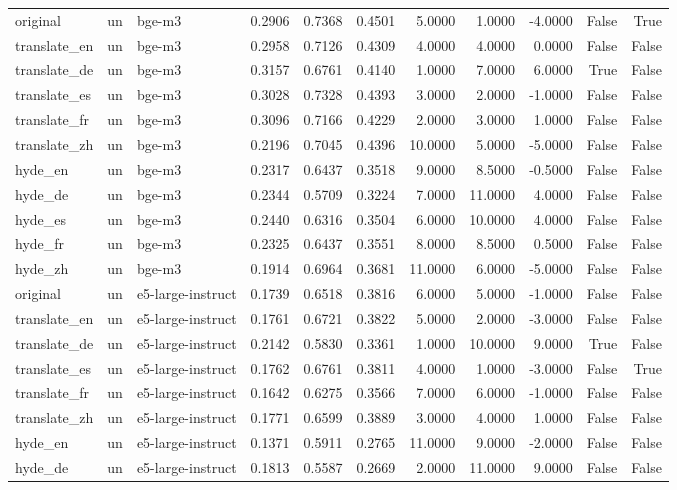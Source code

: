 \begin{tabular}{lllrrrrrrrr}
original & un & bge-m3 & 0.2906 & 0.7368 & 0.4501 & 5.0000 & 1.0000 & -4.0000 & False & True \\
translate\_en & un & bge-m3 & 0.2958 & 0.7126 & 0.4309 & 4.0000 & 4.0000 & 0.0000 & False & False \\
translate\_de & un & bge-m3 & 0.3157 & 0.6761 & 0.4140 & 1.0000 & 7.0000 & 6.0000 & True & False \\
translate\_es & un & bge-m3 & 0.3028 & 0.7328 & 0.4393 & 3.0000 & 2.0000 & -1.0000 & False & False \\
translate\_fr & un & bge-m3 & 0.3096 & 0.7166 & 0.4229 & 2.0000 & 3.0000 & 1.0000 & False & False \\
translate\_zh & un & bge-m3 & 0.2196 & 0.7045 & 0.4396 & 10.0000 & 5.0000 & -5.0000 & False & False \\
hyde\_en & un & bge-m3 & 0.2317 & 0.6437 & 0.3518 & 9.0000 & 8.5000 & -0.5000 & False & False \\
hyde\_de & un & bge-m3 & 0.2344 & 0.5709 & 0.3224 & 7.0000 & 11.0000 & 4.0000 & False & False \\
hyde\_es & un & bge-m3 & 0.2440 & 0.6316 & 0.3504 & 6.0000 & 10.0000 & 4.0000 & False & False \\
hyde\_fr & un & bge-m3 & 0.2325 & 0.6437 & 0.3551 & 8.0000 & 8.5000 & 0.5000 & False & False \\
hyde\_zh & un & bge-m3 & 0.1914 & 0.6964 & 0.3681 & 11.0000 & 6.0000 & -5.0000 & False & False \\
original & un & e5-large-instruct & 0.1739 & 0.6518 & 0.3816 & 6.0000 & 5.0000 & -1.0000 & False & False \\
translate\_en & un & e5-large-instruct & 0.1761 & 0.6721 & 0.3822 & 5.0000 & 2.0000 & -3.0000 & False & False \\
translate\_de & un & e5-large-instruct & 0.2142 & 0.5830 & 0.3361 & 1.0000 & 10.0000 & 9.0000 & True & False \\
translate\_es & un & e5-large-instruct & 0.1762 & 0.6761 & 0.3811 & 4.0000 & 1.0000 & -3.0000 & False & True \\
translate\_fr & un & e5-large-instruct & 0.1642 & 0.6275 & 0.3566 & 7.0000 & 6.0000 & -1.0000 & False & False \\
translate\_zh & un & e5-large-instruct & 0.1771 & 0.6599 & 0.3889 & 3.0000 & 4.0000 & 1.0000 & False & False \\
hyde\_en & un & e5-large-instruct & 0.1371 & 0.5911 & 0.2765 & 11.0000 & 9.0000 & -2.0000 & False & False \\
hyde\_de & un & e5-large-instruct & 0.1813 & 0.5587 & 0.2669 & 2.0000 & 11.0000 & 9.0000 & False & False \\

\end{tabular}
